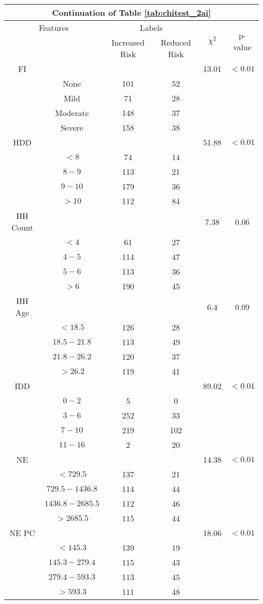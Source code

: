 \begin{table}
\centering
\label{tab:chitest_2ai_cont}
\begin{tabular}{c c | c c| c | c}
\hline
\multicolumn{6}{c}{Continuation of Table \ref{tab:chitest_2ai}}\\ 
\hline
\multicolumn{2}{c|}{Features}& \multicolumn{2}{c|}{Labels}& \multirow{2}{*}{$\chi^2$} & \multirow{2}{*}{p-value}\\ 
& & Increased Risk & Reduced Risk & & \\ 
\hline
FI &  &  & & 13.01 & $< 0.01$ \\ 
& None & 101 & 52& & \\ 
& Mild & 71 & 28& & \\ 
& Moderate & 148 & 37& & \\ 
& Severe & 158 & 38& & \\ 
\hline 
HDD &  &  & & 51.88 & $< 0.01$ \\ 
& $< 8$ & 74 & 14& & \\ 
& $8-9$ & 113 & 21& & \\ 
& $9-10$ & 179 & 36& & \\ 
& $> 10$ & 112 & 84& & \\ 
\hline 
HH Count &  &  & & 7.38 & 0.06 \\ 
& $< 4$ & 61 & 27& & \\ 
& $4-5$ & 114 & 47& & \\ 
& $5-6$ & 113 & 36& & \\ 
& $> 6$ & 190 & 45& & \\ 
\hline 
HH Age &  &  & & 6.4 & 0.09 \\ 
& $< 18.5$ & 126 & 28& & \\ 
& $18.5-21.8$ & 113 & 49& & \\ 
& $21.8-26.2$ & 120 & 37& & \\ 
& $> 26.2$ & 119 & 41& & \\ 
\hline 
IDD &  &  & & 89.02 & $< 0.01$ \\ 
& $0-2$ & 5 & 0& & \\ 
& $3-6$ & 252 & 33& & \\ 
& $7-10$ & 219 & 102& & \\ 
& $11-16$ & 2 & 20& & \\ 
\hline 
NE &  &  & & 14.38 & $< 0.01$ \\ 
& $< 729.5$ & 137 & 21& & \\ 
& $729.5-1436.8$ & 114 & 44& & \\ 
& $1436.8-2685.5$ & 112 & 46& & \\ 
& $> 2685.5$ & 115 & 44& & \\ 
\hline 
NE PC &  &  & & 18.06 & $< 0.01$ \\ 
& $< 145.3$ & 139 & 19& & \\ 
& $145.3-279.4$ & 115 & 43& & \\ 
& $279.4-593.3$ & 113 & 45& & \\ 
& $> 593.3$ & 111 & 48& & \\ 
\hline 
\end{tabular}
\end{table}

